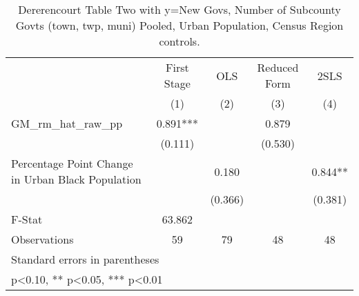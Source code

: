 \begin{table}[htbp]\centering
\def\sym#1{\ifmmode^{#1}\else\(^{#1}\)\fi}
\caption{Dererencourt Table Two with y=New Govs, Number of Subcounty Govts (town, twp, muni)  Pooled, Urban Population, Census Region controls.}
\begin{tabular}{l*{4}{c}}
\toprule
                    & First Stage   &         OLS   &Reduced Form   &        2SLS   \\
                    &\multicolumn{1}{c}{(1)}   &\multicolumn{1}{c}{(2)}   &\multicolumn{1}{c}{(3)}   &\multicolumn{1}{c}{(4)}   \\
\midrule
GM\_rm\_hat\_raw\_pp    &       0.891***&               &       0.879   &               \\
                    &     (0.111)   &               &     (0.530)   &               \\
\addlinespace
Percentage Point Change in Urban Black Population&               &       0.180   &               &       0.844** \\
                    &               &     (0.366)   &               &     (0.381)   \\
\midrule
F-Stat              &      63.862   &               &               &               \\
Observations        &          59   &          79   &          48   &          48   \\
\bottomrule
\multicolumn{5}{l}{\footnotesize Standard errors in parentheses}\\
\multicolumn{5}{l}{\footnotesize * p<0.10, ** p<0.05, *** p<0.01}\\
\end{tabular}
\end{table}
